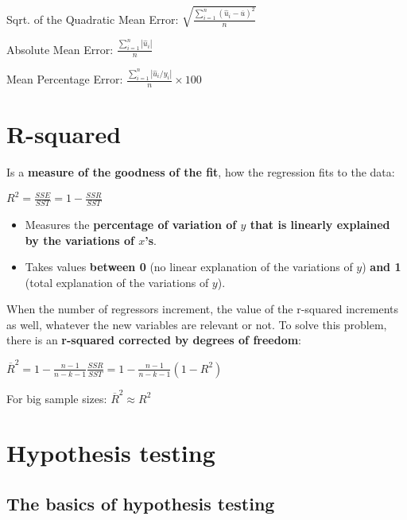 \documentclass[10pt, a4paper, landscape]{extarticle}
\begin{document}
\begin{multicols}{3}
\vspace*{0.5mm}

Sqrt. of the Quadratic Mean Error: \hfill $\sqrt{\frac{\sum_{i=1}^n (\hat{u}_i - \overline{u})^2}{n}}$

\vspace*{0.5mm}

Absolute Mean Error: \hfill $\frac{\sum_{i=1}^n |\hat{u}_i|}{n}$

\vspace*{0.5mm}

Mean Percentage Error: \hfill $\frac{\sum_{i=1}^n |\hat{u}_i / y_i|}{n} \times 100$

\columnbreak

\section*{R-squared}

Is a \textbf{measure of the goodness of the fit}, how the regression fits to the data:

\begin{center}
$R^2 = \frac{SSE}{SST} = 1 - \frac{SSR}{SST}$
\end{center}

\begin{itemize}[leftmargin=*]
\item Measures the \textbf{percentage of variation of $y$ that is linearly explained by the variations of $x$'s}.
\item Takes values \textbf{between 0} (no linear explanation of the variations of $y$) \textbf{and 1} (total explanation of the variations of $y$).
\end{itemize}

When the number of regressors increment, the value of the r-squared increments as well, whatever the new variables are relevant or not. To solve this problem, there is an \textbf{r-squared corrected by degrees of freedom}:

\begin{center}
$\overline{R}^2 = 1 - \frac{n-1}{n-k-1} \frac{SSR}{SST} = 1 - \frac{n-1}{n-k-1} (1-R^2)$
\end{center}

For big sample sizes: $\overline{R}^2 \approx R^2$

\section*{Hypothesis testing}
\subsection*{The basics of hypothesis testing}


\end{multicols}
\end{document}
